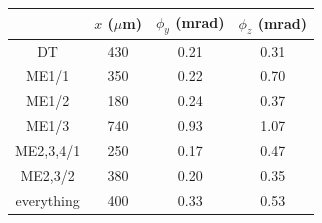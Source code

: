 \documentclass[compress]{beamer}
\begin{document}
\begin{frame}
\begin{center}
\scriptsize
\renewcommand{\arraystretch}{1.2}
\begin{tabular}{c c c c}
& $x$ ($\mu$m) & $\phi_y$ (mrad) & $\phi_z$ (mrad) \\\hline
DT & 430 & 0.21 & 0.31 \\
ME1/1 & 350 & 0.22 & 0.70 \\
ME1/2 & 180 & 0.24 & 0.37 \\
ME1/3 & 740 & 0.93 & 1.07 \\
ME2,3,4/1 & 250 & 0.17 & 0.47 \\
ME2,3/2 & 380 & 0.20 & 0.35 \\\hline
everything & 400 & 0.33 & 0.53
\end{tabular}
\end{center}
\end{frame}
\end{document}
